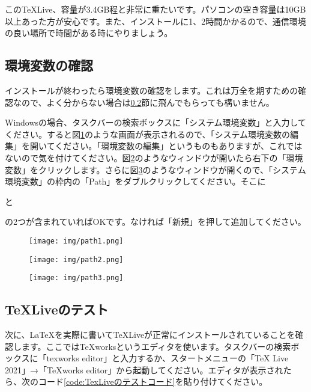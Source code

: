 この\TeX Live、容量が3.4GB程と非常に重たいです。パソコンの空き容量は10GB以上あった方が安心です。また、インストールに1、2時間かかるので、通信環境の良い場所で時間がある時にやりましょう。

\subsection{環境変数の確認}
インストールが終わったら環境変数の確認をします。これは万全を期すための確認なので、よく分からない場合は\ref{textest}節に飛んでもらっても構いません。

Windowsの場合、タスクバーの検索ボックスに「システム環境変数」と入力してください。すると図\ref{fig:path1}のような画面が表示されるので、「システム環境変数の編集」を開いてください。「環境変数の編集」というものもありますが、これではないので気を付けてください。図\ref{fig:path2}のようなウィンドウが開いたら右下の「環境変数」をクリックします。さらに図\ref{fig:path3}のようなウィンドウが開くので、「システム環境変数」の枠内の「Path」をダブルクリックしてください。そこに

\begin{quote}
\begin{verbatim*}
%SystemRoot%\system32
\end{verbatim*}
\end{quote}
と
\begin{quote}
\begin{verbatim*}
%SystemRoot%
\end{verbatim*}
\end{quote}
の2つが含まれていればOKです。なければ「新規」を押して追加してください。
\begin{figure}[H]
    \centering
    \texttt{[image: img/path1.png]}
    \caption{}
    \label{fig:path1}
\end{figure}
\begin{figure}[H]
    \centering
    \texttt{[image: img/path2.png]}
    \caption{}
    \label{fig:path2}
\end{figure}
\begin{figure}[H]
    \centering
    \texttt{[image: img/path3.png]}
    \caption{}
    \label{fig:path3}
\end{figure}

\subsection{\TeX Liveのテスト}\label{textest}
次に、\LaTeX を実際に書いて\TeX Liveが正常にインストールされていることを確認します。ここではTeXworksというエディタを使います。タスクバーの検索ボックスに「texworks editor」と入力するか、スタートメニューの「TeX Live 2021」→「TeXworks editor」から起動してください。エディタが表示されたら、次のコード\ref{code:TexLiveのテストコード}を貼り付けてください。

